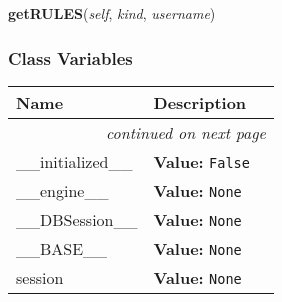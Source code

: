     \label{db_layer:Database:getRULES}

    \vspace{0.5ex}

\hspace{.8\funcindent}\begin{boxedminipage}{\funcwidth}

    \raggedright \textbf{getRULES}(\textit{self}, \textit{kind}, \textit{username})

\setlength{\parskip}{2ex}
\setlength{\parskip}{1ex}
    \end{boxedminipage}



  \subsubsection{Class Variables}

    \vspace{-1cm}
\hspace{\varindent}\begin{longtable}{|p{\varnamewidth}|p{\vardescrwidth}|l}
\cline{1-2}
\cline{1-2} \centering \textbf{Name} & \centering \textbf{Description}& \\
\cline{1-2}
\endhead\cline{1-2}\multicolumn{3}{r}{\small\textit{continued on next page}}\\\endfoot\cline{1-2}
\endlastfoot\raggedright \_\-\_\-i\-n\-i\-t\-i\-a\-l\-i\-z\-e\-d\-\_\-\_\- & \raggedright \textbf{Value:} 
{\tt False}&\\
\cline{1-2}
\raggedright \_\-\_\-e\-n\-g\-i\-n\-e\-\_\-\_\- & \raggedright \textbf{Value:} 
{\tt None}&\\
\cline{1-2}
\raggedright \_\-\_\-D\-B\-S\-e\-s\-s\-i\-o\-n\-\_\-\_\- & \raggedright \textbf{Value:} 
{\tt None}&\\
\cline{1-2}
\raggedright \_\-\_\-B\-A\-S\-E\-\_\-\_\- & \raggedright \textbf{Value:} 
{\tt None}&\\
\cline{1-2}
\raggedright s\-e\-s\-s\-i\-o\-n\- & \raggedright \textbf{Value:} 
{\tt None}&\\
\cline{1-2}
\end{longtable}

